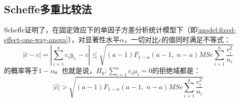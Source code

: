 \subsection{Scheffe多重比较法}
Scheffe证明了，在固定效应下的单因子方差分析统计模型下（即\cref{model:fixed-effect-one-way-anova}），对显著性水平$\alpha$，一切对比$c$的值同时满足不等式：
\begin{equation*}
	|\hat{c}-c|=\left|\sum_{i=1}^ac_i\bar{y}_{i.}-c\right|\leqslant\sqrt{(a-1)F_{1-\alpha}(a-1,\;n-a)MSe\sum\limits_{i=1}^a\dfrac{c_i^2}{n_i}}
\end{equation*}
的概率等于$1-\alpha$。也就是说，$H_0:\sum\limits_{i=1}^ac_i\mu_i=0$的拒绝域都是：
\begin{equation*}
	|\hat{c}|>\sqrt{(a-1)F_{1-\alpha}(a-1,\;n-a)MSe\sum\limits_{i=1}^a\dfrac{c_i^2}{n_i}}
\end{equation*}